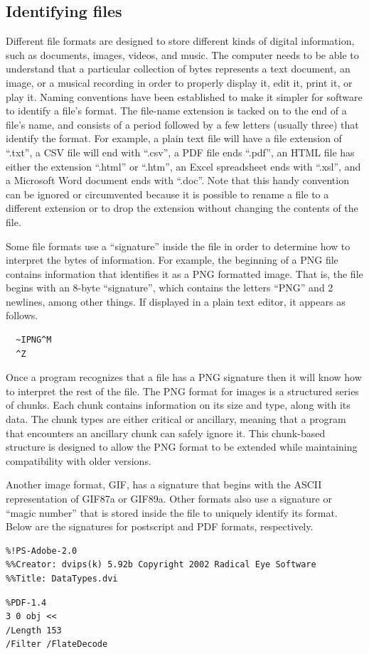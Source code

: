 \subsection{Identifying files}
Different file formats are designed to store different kinds of
digital information, such as documents, images, videos, and music. The
computer needs to be able to understand that a particular collection
of bytes represents a text document, an image, or a musical recording
in order to properly display it, edit it, print it, or play it.
Naming conventions have been established to make it simpler for
software to identify a file's format.  The file-name extension is
tacked on to the end of a file's name, and consists of a period
followed by a few letters (usually three) that identify the format.
For example, a plain text file will have a file extension of ``.txt'',
a CSV file will end with ``.csv'', a PDF file ends ``.pdf'', an HTML
file has either the extension ``.html'' or ``.htm'', an Excel
spreadsheet ends with ``.xsl'', and a Microsoft Word document ends
with ``.doc''.  Note that this handy convention can be ignored or
circumvented because it is possible to rename a file to a different
extension or to drop the extension without changing the contents of
the file.

Some file formats use a ``signature'' inside the file in order to
determine how to interpret the bytes of information. For example, the
beginning of a PNG file contains information that identifies it as a
PNG formatted image.  That is, the file begins with an 8-byte
``signature'', which contains the letters ``PNG'' and 2 newlines,
among other things.  If displayed in a plain text editor, it appears
as follows.
\begin{verbatim}
  ~IPNG^M
  ^Z
\end{verbatim} 
Once a program recognizes that a file has a PNG signature then it will
know how to interpret the rest of the file.  The PNG format for images
is a structured series of chunks.  Each chunk contains information on
its size and type, along with its data.  The chunk types are either
critical or ancillary, meaning that a program that encounters an
ancillary chunk can safely ignore it.  This chunk-based structure is
designed to allow the PNG format to be extended while maintaining
compatibility with older versions.

Another image format, GIF, has a signature that begins with the ASCII
representation of GIF87a or GIF89a.  Other formats also use a
signature or ``magic number'' that is stored inside the file to
uniquely identify its format.  Below are the signatures for postscript
and PDF formats, respectively.
{\footnotesize{
\begin{verbatim}
%!PS-Adobe-2.0
%%Creator: dvips(k) 5.92b Copyright 2002 Radical Eye Software
%%Title: DataTypes.dvi
\end{verbatim}

\begin{verbatim}
%PDF-1.4
3 0 obj <<
/Length 153
/Filter /FlateDecode
\end{verbatim}
}}

